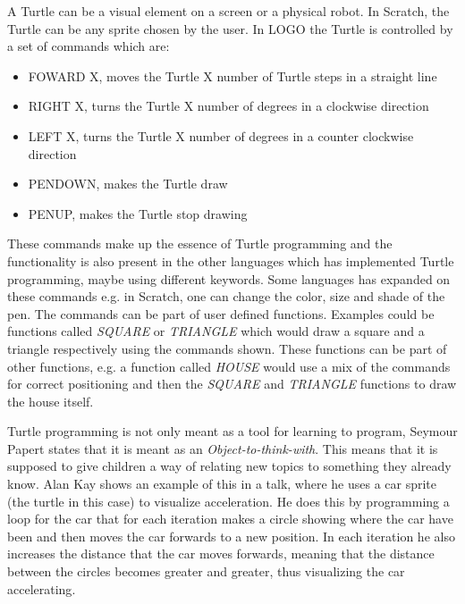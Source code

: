 A Turtle can be a visual element on a screen or a physical robot. In Scratch, the Turtle can be any sprite chosen by the user. In LOGO the Turtle is controlled by a set of commands which are:
\begin{itemize}
\item FOWARD X, moves the Turtle X number of Turtle steps in a straight line
\item RIGHT X, turns the Turtle X number of degrees in a clockwise direction
\item LEFT X, turns the Turtle X number of degrees in a counter clockwise direction
\item PENDOWN, makes the Turtle draw
\item PENUP, makes the Turtle stop drawing
\end{itemize}
These commands make up the essence of Turtle programming and the functionality is also present in the other languages which has implemented Turtle programming, maybe using different keywords. Some languages has expanded on these commands e.g. in Scratch, one can change the color, size and shade of the pen. The commands can be part of user defined functions. Examples could be functions called \emph{SQUARE} or \emph{TRIANGLE} which would draw a square and a triangle respectively using the commands shown. These functions can be part of other functions, e.g. a function called \emph{HOUSE} would use a mix of the commands for correct positioning and then the \emph{SQUARE} and \emph{TRIANGLE} functions to draw the house itself\cite{turtle_func}.

Turtle programming is not only meant as a tool for learning to program, Seymour Papert states that it is meant as an \emph{Object-to-think-with}. This means that it is supposed to give children a way of relating new topics to something they already know. Alan Kay shows an example of this in a talk, where he uses a car sprite (the turtle in this case) to visualize acceleration. He does this by programming a loop for the car that for each iteration makes a circle showing where the car have been and then moves the car forwards to a new position. In each iteration he also increases the distance that the car moves forwards, meaning that the distance between the circles becomes greater and greater, thus visualizing the car accelerating\cite{alan_turtle_video}.

